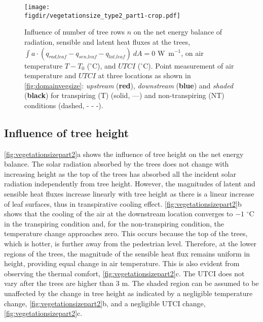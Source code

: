 	\begin{figure}[t]
	\centering
	\texttt{[image: \\figdir/vegetationsize\_type2\_part1-crop.pdf]}
	\caption{Influence of number of tree rows $n$ on  the net energy balance of radiation, sensible and latent heat fluxes at the trees, $\int a \cdot (q_{\textit{rad,leaf}}-q_{\textit{sen,leaf}}-q_{\textit{lat,leaf}})\ dA = 0$ W~m$^{-1}$,  on air temperature $T-T_0$ ($^{\circ}$C), and  $\textit{UTCI}$ ($^{\circ}$C). Point measurement of air temperature and $UTCI$ at three locations as shown in \cref{fig:domainvegsize}: \textit{upstream} ({\color{flatuidarkred}\textbf{red}}), \textit{downstream} ({\color{flatuidarkblue}\textbf{blue}}) and \textit{shaded} (\textbf{black}) for transpiring (T) (solid, ---) and non-transpiring (NT) conditions (dashed, - - -).}
	\label{fig:vegetationsizepart1}
	\end{figure}

\subsection{Influence of tree height}

\cref{fig:vegetationsizepart2}a shows the influence of tree height on the net energy balance. The solar radiation absorbed by the trees does not change with increasing height as the top of the trees has absorbed all the incident solar radiation independently from tree height. However, the magnitudes of latent and sensible heat fluxes increase linearly with tree height as there is a linear increase of leaf surfaces, thus in transpirative cooling effect. \cref{fig:vegetationsizepart2}b shows that the cooling of the air at the downstream location converges to $-1$ $^{\circ}$C in the transpiring condition and, for the non-transpiring condition, the temperature change approaches zero. This occurs because the top of the trees, which is hotter, is further away from the pedestrian level. Therefore, at the lower regions of the trees, the magnitude of the sensible heat flux remains uniform in height, providing equal change in air temperature. This is also evident from observing the thermal comfort, \cref{fig:vegetationsizepart2}c.  The UTCI does not vary after the trees are higher than $3$ m. The shaded region can be assumed to be unaffected by the change in tree height as indicated by a negligible temperature change, \cref{fig:vegetationsizepart2}b, and a negligible UTCI change, \cref{fig:vegetationsizepart2}c.  

